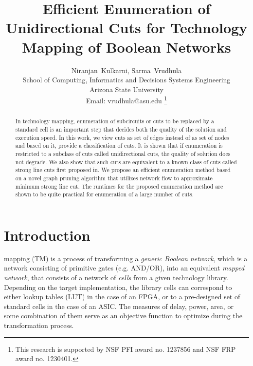\documentclass[journal]{IEEEtran}
\begin{document}
\title{Efficient Enumeration of  Unidirectional Cuts for Technology Mapping of Boolean Networks}

\author{Niranjan~Kulkarni,  Sarma~Vrudhula\\

School of Computing, Informatics and Decisions Systems Engineering\\
Arizona State University\\
Email: vrudhula@asu.edu \thanks{This research is supported by NSF PFI award no. 1237856 and NSF FRP award no. 1230401.}}


\maketitle

\begin{abstract}
In technology mapping, enumeration of subcircuits or cuts to be replaced by a standard cell is an important step that decides both the quality of the solution and execution speed. In this work, we view cuts as set of edges instead of as set of nodes and based on it, provide a classification of cuts. It is shown that if enumeration is restricted to a subclass of cuts called unidirectional cuts, the quality of solution does not degrade. We also show that such cuts are equivalent to a known class of cuts called strong line cuts first proposed in\cite{kagaris1999maximum}. We propose an efficient enumeration method based on a novel graph pruning algorithm that utilizes network flow to approximate minimum strong line cut. The runtimes for the proposed enumeration method are shown to be quite practical for enumeration of a large number of cuts.
\end{abstract}

\section{Introduction}
\label{sec:introduction}

 mapping (TM) is a process of transforming a \emph{generic Boolean network}, which is a network consisting of primitive gates (e.g. AND/OR), into an equivalent \emph{mapped network}, that consists of  a network of \textit{cells} from a given technology library. Depending on the target implementation, the library cells can correspond to either lookup tables (LUT) in the case of an FPGA, or to a pre-designed set of standard cells in the case of an ASIC. The measures of delay, power, area, or some combination of them serve as an objective function to optimize during the transformation process. 
\end{document}
